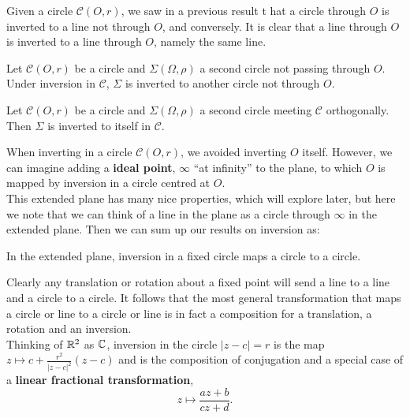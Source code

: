 Given a circle \(\mathcal{C}(O, r)\), we saw in a previous result t hat a circle through \(O\) is inverted to a line not through \(O\), and conversely. It is clear that a line through \(O\) is inverted to a line through \(O\), namely the same line.

\begin{theorem}
    Let \(\mathcal{C}(O, r)\) be a circle and \(\Sigma(\Omega, \rho)\) a second circle not passing through \(O\). Under inversion in \(\mathcal{C}\), \(\Sigma\) is inverted to another circle not through \(O\).
\end{theorem}

\begin{theorem}
    Let \(\mathcal{C}(O, r)\) be a circle and \(\Sigma(\Omega, \rho)\) a second circle meeting \(\mathcal{C}\) orthogonally. Then \(\Sigma\) is inverted to itself in \(\mathcal{C}\).
\end{theorem}

When inverting in a circle \(\mathcal{C}(O, r)\), we avoided inverting \(O\) itself. However, we can imagine adding a \textbf{ideal point}, \(\infty\) ``at infinity'' to the plane, to which \(O\) is mapped by inversion in a circle centred at \(O\). \\

This extended plane has many nice properties, which will explore later, but here we note that we can think of a line in the plane as a circle through \(\infty\) in the extended plane. Then we can sum up our results on inversion as:

\begin{theorem}
    In the extended plane, inversion in a fixed circle maps a circle to a circle.
\end{theorem}

Clearly any translation or rotation about a fixed point will send a line to a line and a circle to a circle. It follows that the most general transformation that maps a circle or line to a circle or line is in fact a composition for a translation, a rotation and an inversion. \\

Thinking of \(\mathbb{R}^2\) as \(\mathbb{C}\), inversion in the circle \(|z - c| = r\) is the map \(z \mapsto c + \frac{r^2}{|z - c|^2}(z - c)\) and is the composition of conjugation and a special case of a \textbf{linear fractional transformation},
\[z \mapsto \frac{az + b}{cz + d}.\]